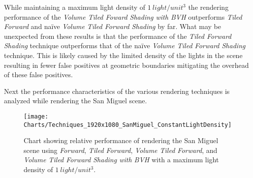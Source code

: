 While maintaining a maximum light density of $1~light/unit^3$ the rendering performance of the \emph{Volume Tiled Foward Shading with BVH} outperforms \emph{Tiled Forward} and naïve \emph{Volume Tiled Forward Shading} by far. What may be unexpected from these results is that the performance of the \emph{Tiled Forward Shading} technique outperforms that of the naïve \emph{Volume Tiled Forward Shading} technique. This is likely caused by the limited density of the lights in the scene resulting in fewer false positives at geometric boundaries mitigating the overhead of these false positives.

Next the performance characteristics of the various rendering techniques is analyzed while rendering the San Miguel scene.

\begin{figure}[H]
\centering
\texttt{[image: Charts/Techniques\_1920x1080\_SanMiguel\_ConstantLightDensity]}
\decoRule
\caption{Chart showing relative performance of rendering the San Miguel scene using \emph{Forward}, \emph{Tiled Forward}, \emph{Volume Tiled Forward}, and \emph{Volume Tiled Forward Shading with BVH} with a maximum light density of $1~light/unit^3$. }
\label{fig:Techniques_1920x1080_SanMiguel_ConstantLightDensity}
\end{figure}


